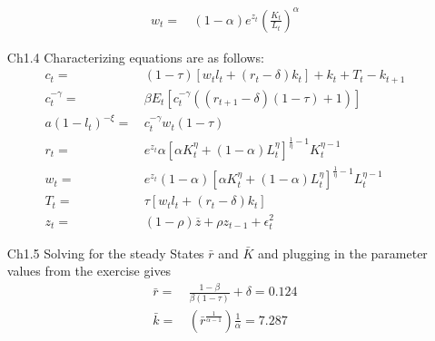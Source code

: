 \documentclass[letterpaper,12pt]{article}
\theoremstyle{definition}
\begin{document}
\begin{enumerate}
\begin{align*}
w_t = &\, (1-\alpha) e^{z_t} \left( \frac{K_t}{L_t} \right)^{\alpha}
\end{align*}
\item[Ch1.4]
Characterizing equations are as follows:
\begin{align*}
c_t =&\, (1 - \tau) [w_t l_t + (r_t - \delta) k_t] + k_t + T_t - k_{t+1} \\
c_t^{- \gamma} =&\, \beta E_t[ c_t^{- \gamma} (( r_{t+1} - \delta )(1 - \tau) + 1)]\\
a(1 - l_t)^{- \xi} = &\,c_t^{- \gamma} w_t (1 - \tau)\\
r_t = &\,e^{z_t} \alpha [\alpha K_t^{\eta} + (1 - \alpha) L_t^{\eta}]^{\frac{1}{\eta}-1} K_t^{\eta - 1}\\
w_t = &\,e^{z_t} (1 - \alpha) [\alpha K_t^{\eta} + (1 - \alpha) L_t^{\eta}]^{\frac{1}{\eta}-1} L_t^{\eta - 1}\\
T_t  = &\,\tau [w_tl_t + (r_t - \delta) k_t]\\
z_t = &\,(1 - \rho)\overline{z} + \rho z_{t-1} + \epsilon_t^2 
\end{align*}
\item[Ch1.5]
Solving for the steady States $\bar{r}$ and $\bar{K}$ and plugging in the parameter values from the exercise gives
\begin{align*}
\bar{r} =&\, \frac{1-\beta}{\beta(1-\tau)}+\delta = 0.124\\
\bar{k} = &\, \left( \bar{r}^{\frac{1}{\alpha - 1}} \right)\frac{1}{\alpha}=7.287
\end{align*}


\end{enumerate}
\end{document}
